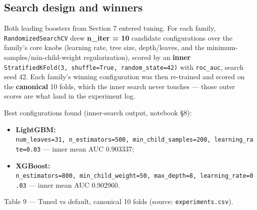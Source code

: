 \documentclass[11pt,a4paper]{article}
\providecommand{\tightlist}{\setlength{\itemsep}{2pt}\setlength{\parskip}{0pt}}
\begin{document}
{\subsection{Search design and winners}\label{search-design-and-winners}

Both leading boosters from Section 7 entered tuning. For each family, \texttt{RandomizedSearchCV} drew \textbf{n\_iter = 10} candidate configurations over the family's core knobs (learning rate, tree size, depth/leaves, and the minimum-samples/min-child-weight regularization), scored by an \textbf{inner} \texttt{StratifiedKFold(3,\ shuffle=True,\ random\_state=42)} with \texttt{roc\_auc}, search seed 42. Each family's winning configuration was then re-trained and scored on the \textbf{canonical} 10 folds, which the inner search never touches --- those outer scores are what land in the experiment log.

Best configurations found (inner-search output, notebook \S{}8):

\begin{itemize}
\tightlist
\item
  \textbf{LightGBM:} \texttt{num\_leaves=31,\ n\_estimators=500,\ min\_child\_samples=200,\ learning\_rate=0.03} --- inner mean AUC 0.903337;
\item
  \textbf{XGBoost:} \texttt{n\_estimators=800,\ min\_child\_weight=50,\ max\_depth=8,\ learning\_rate=0.03} --- inner mean AUC 0.902960.
\end{itemize}

Table 9 --- Tuned vs default, canonical 10 folds (source: \texttt{experiments.csv}).

{\def\LTcaptype{none} %

}}
\end{document}
